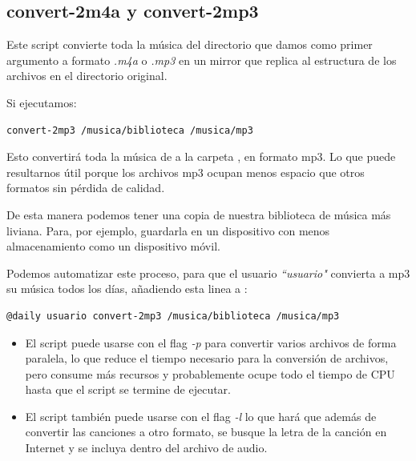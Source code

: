\documentclass[11pt]{article}
\begin{document}
\subsection{convert-2m4a y convert-2mp3}

Este script convierte toda la música del directorio que damos como primer argumento a formato \textit{.m4a} o \textit{.mp3} en un mirror que replica al estructura de los archivos en el directorio original.

\vspace{2.5pt}

\noindent Si ejecutamos:

\begin{verbatim}
convert-2mp3 /musica/biblioteca /musica/mp3
\end{verbatim}

Esto convertirá toda la música de  a la carpeta , en formato mp3. Lo que puede resultarnos útil porque los archivos mp3 ocupan menos espacio que otros formatos sin pérdida de calidad.

\vspace{5pt}

\noindent De esta manera podemos tener una copia de nuestra biblioteca de música más liviana. Para, por ejemplo, guardarla en un dispositivo con menos almacenamiento como un dispositivo móvil.

\vspace{5pt}

Podemos automatizar este proceso, para que el usuario \textit{``usuario"} convierta a mp3 su música todos los días, añadiendo esta linea a :

\begin{verbatim}
@daily usuario convert-2mp3 /musica/biblioteca /musica/mp3
\end{verbatim}

\begin{itemize}
\item El script puede usarse con el flag \textit{-p} para convertir varios archivos de forma paralela, lo que reduce el tiempo necesario para la conversión de archivos, pero consume más recursos y probablemente ocupe todo el tiempo de CPU hasta que el script se termine de ejecutar.
\item El script también puede usarse con el flag \textit{-l} lo que hará que además de convertir las canciones a otro formato, se busque la letra de la canción en Internet y se incluya dentro del archivo de audio.
\end{itemize}
\end{document}
